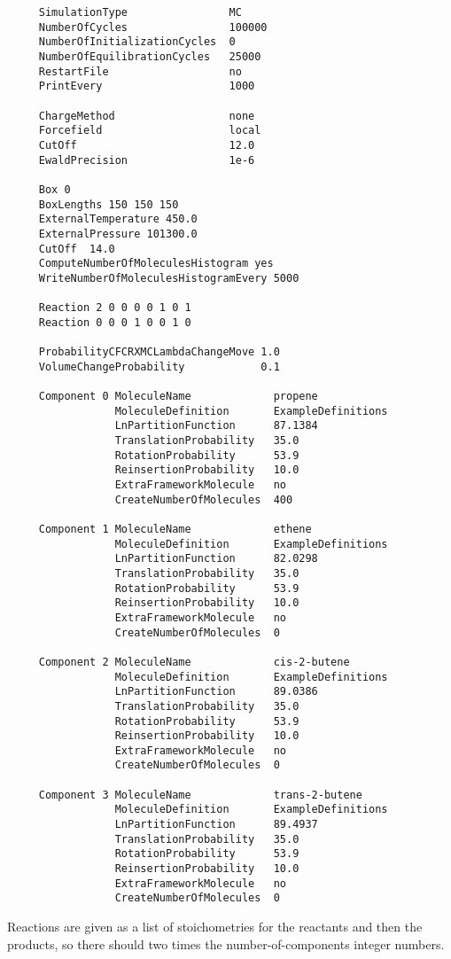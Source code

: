 \begin{tiny}
\begin{verbatim}
     SimulationType                MC
     NumberOfCycles                100000
     NumberOfInitializationCycles  0
     NumberOfEquilibrationCycles   25000
     RestartFile                   no
     PrintEvery                    1000

     ChargeMethod                  none
     Forcefield                    local
     CutOff                        12.0
     EwaldPrecision                1e-6

     Box 0
     BoxLengths 150 150 150
     ExternalTemperature 450.0
     ExternalPressure 101300.0
     CutOff  14.0
     ComputeNumberOfMoleculesHistogram yes
     WriteNumberOfMoleculesHistogramEvery 5000

     Reaction 2 0 0 0 0 1 0 1
     Reaction 0 0 0 1 0 0 1 0

     ProbabilityCFCRXMCLambdaChangeMove 1.0
     VolumeChangeProbability            0.1

     Component 0 MoleculeName             propene
                 MoleculeDefinition       ExampleDefinitions
                 LnPartitionFunction      87.1384
                 TranslationProbability   35.0
                 RotationProbability      53.9
                 ReinsertionProbability   10.0
                 ExtraFrameworkMolecule   no
                 CreateNumberOfMolecules  400

     Component 1 MoleculeName             ethene
                 MoleculeDefinition       ExampleDefinitions
                 LnPartitionFunction      82.0298
                 TranslationProbability   35.0
                 RotationProbability      53.9
                 ReinsertionProbability   10.0
                 ExtraFrameworkMolecule   no
                 CreateNumberOfMolecules  0

     Component 2 MoleculeName             cis-2-butene
                 MoleculeDefinition       ExampleDefinitions
                 LnPartitionFunction      89.0386
                 TranslationProbability   35.0
                 RotationProbability      53.9
                 ReinsertionProbability   10.0
                 ExtraFrameworkMolecule   no
                 CreateNumberOfMolecules  0

     Component 3 MoleculeName             trans-2-butene
                 MoleculeDefinition       ExampleDefinitions
                 LnPartitionFunction      89.4937
                 TranslationProbability   35.0
                 RotationProbability      53.9
                 ReinsertionProbability   10.0
                 ExtraFrameworkMolecule   no
                 CreateNumberOfMolecules  0
\end{verbatim}
\end{tiny}
Reactions are given as a list of stoichometries for the reactants and then the products, so there should two times the number-of-components integer numbers.

